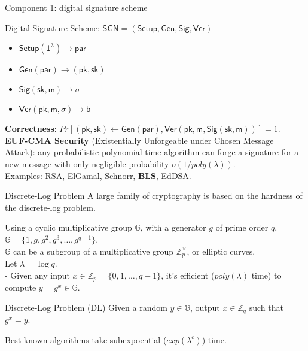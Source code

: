 \documentclass[10pt]{beamer}
\begin{document}
\begin{frame}{Component 1: digital signature scheme}
\begin{block}{Digital Signature Scheme: $\mathsf{SGN} = \mathsf{(Setup, Gen, Sig, Ver)}$}
    \begin{itemize}
        \item $\mathsf{Setup(1^\lambda)\to par}$
        \item $\mathsf{Gen(par)\to (pk, sk)}$
        \item $\mathsf{Sig(sk,m)\to \sigma}$
        \item $\mathsf{Ver(pk,m,\sigma)\to b}$
    \end{itemize}
\end{block}
\textbf{Correctness}: $Pr[(\mathsf{pk}, \mathsf{sk})\leftarrow \mathsf{Gen(par)}, \mathsf{Ver(pk, m, Sig(sk, m))}]=1$. \\
\textbf{EUF-CMA Security} (Existentially Unforgeable under Chosen Message Attack): any probabilistic polynomial time algorithm can forge a signature for a new message with only negligible probability $o(1/poly(\lambda))$. \\
\vspace{1em}
Examples: RSA, ElGamal, Schnorr, \textbf{BLS}, EdDSA. 
\end{frame}

\begin{frame}{Discrete-Log Problem}
A large family of cryptography is based on the hardness of the discrete-log problem. 
\vspace{0.5em}

Using a cyclic multiplicative group $\mathbb{G}$, with a generator $g$ of prime order $q$, $\mathbb{G} = \{1, g, g^2, g^3,\dots, g^{q-1}\}$. \\
$\mathbb{G}$ can be a subgroup of a multiplicative group $\mathbb{Z}_p^\times$, or elliptic curves. \\
\pause 
\vspace{0.4em}
Let $\lambda = \log q$. \\
- Given any input $x\in \mathbb{Z}_{p} =\{0,1,\dots, q-1\}$, it's efficient ($poly(\lambda)$ time) to compute $y=g^x\in \mathbb{G}$. 

\pause
\begin{block}{Discrete-Log Problem (DL)}
Given a random $y\in \mathbb{G}$, output $x\in \mathbb{Z}_q$ such that $g^x=y$. 
\end{block}

Best known algorithms take subexpoential ($exp(\lambda^c)$) time. 
\end{frame}
\end{document}
